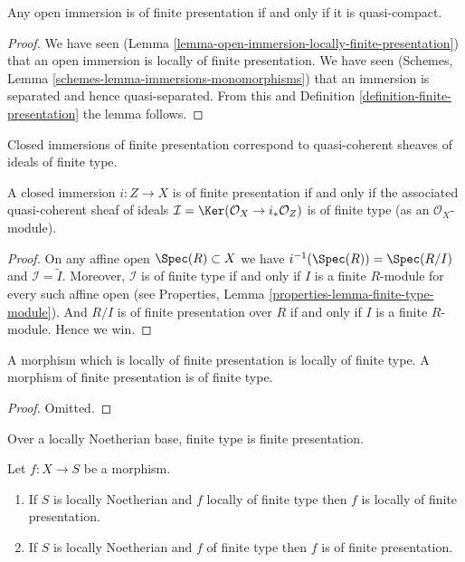 \begin{lemma}
\label{lemma-quasi-compact-open-immersion-finite-presentation}
Any open immersion is of finite presentation if and only if
it is quasi-compact.
\end{lemma}

\begin{proof}
We have seen (Lemma \ref{lemma-open-immersion-locally-finite-presentation})
that an open immersion is locally of finite presentation.
We have seen (Schemes, Lemma \ref{schemes-lemma-immersions-monomorphisms})
that an immersion is separated and hence quasi-separated. From this
and Definition \ref{definition-finite-presentation} the lemma follows.
\end{proof}

\begin{lemma}
\label{lemma-closed-immersion-finite-presentation}
\begin{slogan}
Closed immersions of finite presentation correspond
to quasi-coherent sheaves of ideals of finite type.
\end{slogan}
A closed immersion $i : Z \to X$ is of finite presentation if and only if
the associated quasi-coherent sheaf of ideals
$\mathcal{I} = \Ker(\mathcal{O}_X \to i_*\mathcal{O}_Z)$
is of finite type (as an $\mathcal{O}_X$-module).
\end{lemma}

\begin{proof}
On any affine open $\Spec(R) \subset X$ we have
$i^{-1}(\Spec(R)) = \Spec(R/I)$ and
$\mathcal{I} = \widetilde{I}$. Moreover, $\mathcal{I}$
is of finite type if and only if $I$ is a finite $R$-module
for every such affine open (see
Properties, Lemma \ref{properties-lemma-finite-type-module}).
And $R/I$ is of finite presentation
over $R$ if and only if $I$ is a finite $R$-module. Hence we win.
\end{proof}

\begin{lemma}
\label{lemma-finite-presentation-finite-type}
A morphism which is locally of finite presentation is locally of finite type.
A morphism of finite presentation is of finite type.
\end{lemma}

\begin{proof}
Omitted.
\end{proof}

\begin{lemma}
\label{lemma-noetherian-finite-type-finite-presentation}
\begin{slogan}
Over a locally Noetherian base, finite type is finite presentation.
\end{slogan}
Let $f : X \to S$ be a morphism.
\begin{enumerate}
\item If $S$ is locally Noetherian and $f$ locally of finite type
then $f$ is locally of finite presentation.
\item If $S$ is locally Noetherian and $f$ of finite type
then $f$ is of finite presentation.
\end{enumerate}
\end{lemma}

